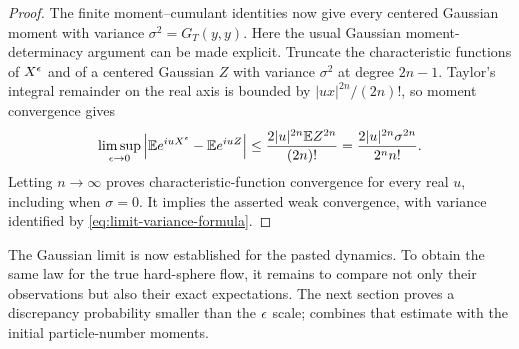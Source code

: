 \begin{proof}
The finite moment--cumulant identities now give every centered
Gaussian moment with variance \(\sigma^2=G_T(y,y)\).
Here the usual Gaussian moment-determinacy argument can be made
explicit.  Truncate the characteristic functions of \(X^\epsilon\)
and of a centered Gaussian \(Z\) with variance \(\sigma^2\) at
degree \(2n-1\).  Taylor's integral remainder on the real axis is
bounded by \(|u x|^{2n}/(2n)!\), so moment convergence gives
\[
 \limsup_{\epsilon\to0}
  \left|\mathbb E e^{iuX^\epsilon}-\mathbb E e^{iuZ}\right|
 \le \frac{2|u|^{2n}\mathbb E Z^{2n}}{(2n)!}
 =\frac{2|u|^{2n}\sigma^{2n}}{2^n n!}.
\]
Letting \(n\to\infty\) proves characteristic-function convergence
for every real \(u\), including when \(\sigma=0\).
It implies the asserted weak convergence, with variance identified
by \eqref{eq:limit-variance-formula}.
\end{proof}

The Gaussian limit is now established for the pasted dynamics.  To
obtain the same law for the true hard-sphere flow, it remains to compare
not only their observations but also their exact expectations.  The
next section proves a discrepancy probability smaller than the
\(\epsilon\) scale;  combines that estimate with the
initial particle-number moments.
